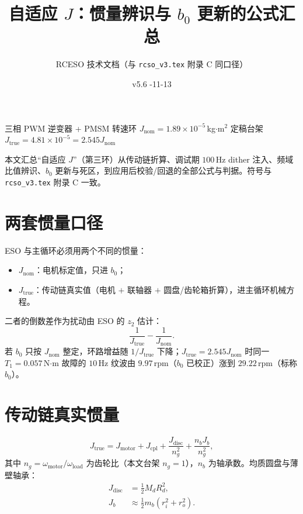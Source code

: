 \documentclass[11pt,a4paper]{article}
\title{\bfseries 自适应 $J$：惯量辨识与 $b_0$ 更新的公式汇总}
\author{RCESO 技术文档（与 \texttt{rcso\_v3.tex} 附录 C 同口径）}
\date{v5.6 \quad 2026-11-13}
\newcommand{\Jnom}{J_{\mathrm{nom}}}
\newcommand{\Jtrue}{J_{\mathrm{true}}}
\begin{document}
\maketitle
\vspace{-4mm}
\begin{center}
\small 三相 PWM 逆变器 + PMSM 转速环 \quad $\Jnom=1.89\times10^{-5}$\,kg$\cdot$m$^2$ \quad 定稿台架 $\Jtrue=4.81\times10^{-5}=2.545\Jnom$
\end{center}

本文汇总“自适应 $J$”（第三环）从传动链折算、调试期 $100$\,Hz dither 注入、频域比值辨识、$b_0$ 更新与死区，到应用后校验/回退的全部公式与判据。符号与 \texttt{rcso\_v3.tex} 附录 C 一致。

\section{两套惯量口径}

ESO 与主循环必须用两个不同的惯量：
\begin{itemize}
  \item $\Jnom$：电机标定值，只进 $b_0$；
  \item $\Jtrue$：传动链真实值（电机 $+$ 联轴器 $+$ 圆盘/齿轮箱折算），进主循环机械方程。
\end{itemize}
二者的倒数差作为扰动由 ESO 的 $z_2$ 估计：
\begin{equation}
\frac{1}{\Jtrue}-\frac{1}{\Jnom}.
\label{eq:twoJ}
\end{equation}
若 $b_0$ 只按 $\Jnom$ 整定，环路增益随 $1/\Jtrue$ 下降；$\Jtrue=2.545\Jnom$ 时同一 $T_1=0.057$\,N$\cdot$m 故障的 $10$\,Hz 纹波由 $9.97$\,rpm（$b_0$ 已校正）涨到 $29.22$\,rpm（标称 $b_0$）。

\section{传动链真实惯量}

\begin{equation}
\Jtrue=J_{\mathrm{motor}}+J_{\mathrm{cpl}}+\frac{J_{\mathrm{disc}}}{n_g^2}+\frac{n_b J_b}{n_g^2},
\label{eq:Jtrue}
\end{equation}
其中 $n_g=\omega_{\mathrm{motor}}/\omega_{\mathrm{load}}$ 为齿轮比（本文台架 $n_g=1$），$n_b$ 为轴承数。均质圆盘与薄壁轴承：
\begin{align}
J_{\mathrm{disc}}&=\tfrac12 M_d R_d^2,\\
J_b&\approx\tfrac12 m_b\left(r_i^2+r_o^2\right).
\end{align}
\end{document}
